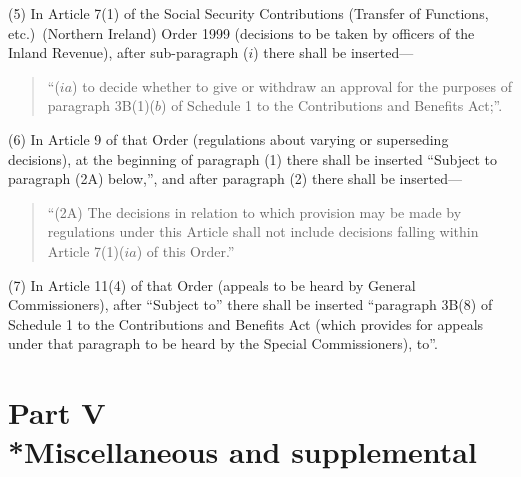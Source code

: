 \documentclass[12pt,a4paper]{article}
\begin{document}
(5) In Article 7(1)  of the Social Security Contributions (Transfer of Functions, etc.)\ (Northern Ireland) Order 1999 (decisions to be taken by officers of the Inland Revenue), after sub-paragraph ($i$)  there shall be inserted—
\begin{quotation}
“($ia$) to decide whether to give or withdraw an approval for the purposes of paragraph 3B(1)($b$)  of Schedule 1 to the Contributions and Benefits Act;”.
\end{quotation}

(6) In Article 9 of that Order (regulations about varying or superseding decisions), at the beginning of paragraph (1)  there shall be inserted “Subject to paragraph (2A)  below,”, and after paragraph (2)  there shall be inserted—
\begin{quotation}
“(2A) The decisions in relation to which provision may be made by regulations under this Article shall not include decisions falling within Article 7(1)($ia$) of this Order.”
\end{quotation}

(7) In Article 11(4)  of that Order (appeals to be heard by General Commissioners), after “Subject to” there shall be inserted “paragraph 3B(8)  of Schedule 1 to the Contributions and Benefits Act (which provides for appeals under that paragraph to be heard by the Special Commissioners), to”.

\part[Part V --- Miscellaneous and supplemental]{Part V\\*Miscellaneous and supplemental}

\renewcommand\parthead{--- Part V}
\end{document}
